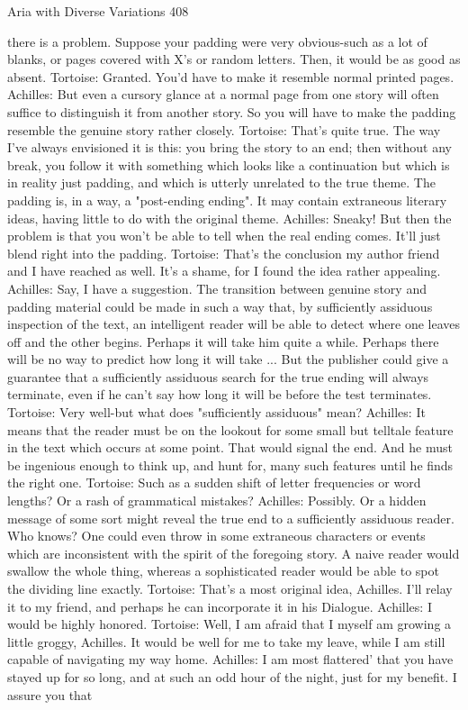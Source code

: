 Aria with Diverse Variations                                                             408

    there is a problem. Suppose your padding were very obvious-such as a lot of blanks,
    or pages covered with X's or random letters. Then, it would be as good as absent.
Tortoise: Granted. You'd have to make it resemble normal printed pages.
Achilles: But even a cursory glance at a normal page from one story will often suffice to
    distinguish it from another story. So you will have to make the padding resemble the
    genuine story rather closely.
Tortoise: That's quite true. The way I've always envisioned it is this: you bring the story
    to an end; then without any break, you follow it with something which looks like a
    continuation but which is in reality just padding, and which is utterly unrelated to the
    true theme. The padding is, in a way, a "post-ending ending". It may contain
    extraneous literary ideas, having little to do with the original theme.
Achilles: Sneaky! But then the problem is that you won't be able to tell when the real
    ending comes. It'll just blend right into the padding.
Tortoise: That's the conclusion my author friend and I have reached as well. It's a shame,
    for I found the idea rather appealing.
Achilles: Say, I have a suggestion. The transition between genuine story and padding
    material could be made in such a way that, by sufficiently assiduous inspection of
    the text, an intelligent reader will be able to detect where one leaves off and the other
    begins. Perhaps it will take him quite a while. Perhaps there will be no way to
    predict how long it will take ... But the publisher could give a guarantee that a
    sufficiently assiduous search for the true ending will always terminate, even if he
    can't say how long it will be before the test terminates.
Tortoise: Very well-but what does "sufficiently assiduous" mean?
Achilles: It means that the reader must be on the lookout for some small but telltale
    feature in the text which occurs at some point. That would signal the end. And he
    must be ingenious enough to think up, and hunt for, many such features until he
    finds the right one.
Tortoise: Such as a sudden shift of letter frequencies or word lengths? Or a rash of
    grammatical mistakes?
Achilles: Possibly. Or a hidden message of some sort might reveal the true end to a
    sufficiently assiduous reader. Who knows? One could even throw in some
    extraneous characters or events which are inconsistent with the spirit of the
    foregoing story. A naive reader would swallow the whole thing, whereas a
    sophisticated reader would be able to spot the dividing line exactly.
Tortoise: That's a most original idea, Achilles. I'll relay it to my friend, and perhaps he
    can incorporate it in his Dialogue.
Achilles: I would be highly honored.
Tortoise: Well, I am afraid that I myself am growing a little groggy, Achilles. It would be
    well for me to take my leave, while I am still capable of navigating my way home.
Achilles: I am most flattered' that you have stayed up for so long, and at such an odd hour
    of the night, just for my benefit. I assure you that




